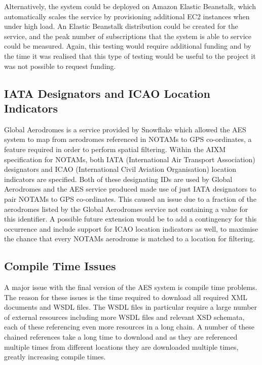 \documentclass[a4paper, 12pt, twoside]{article}
\begin{document}
Alternatively, the system could be deployed on Amazon Elastic Beanstalk, which automatically scales the service by provisioning additional EC2 instances when under high load. An Elastic Beanstalk distribution could be created for the service, and the peak number of subscriptions that the system is able to service could be measured. Again, this testing would require additional funding and by the time it was realised that this type of testing would be useful to the project it was not possible to request funding.

\subsection{IATA Designators and ICAO Location Indicators}
\label{sec:future_designators}

Global Aerodromes is a service provided by Snowflake which allowed the AES system to map from aerodromes referenced in NOTAMs to GPS co-ordinates, a feature required in order to perform spatial filtering. Within the AIXM specification for NOTAMs, both IATA (International Air Transport Association) designators and ICAO (International Civil Aviation Organisation) location indicators are specified. Both of these designating IDs are used by Global Aerodromes and the AES service produced made use of just IATA designators to pair NOTAMs to GPS co-ordinates. This caused an issue due to a fraction of the aerodromes listed by the Global Aerodromes service not containing a value for this identifier. A possible future extension would be to add a contingency for this occurrence and include support for ICAO location indicators as well, to maximise the chance that every NOTAMs aerodrome is matched to a location for filtering.

\subsection{Compile Time Issues}
\label{sec:future_compilation}

A major issue with the final version of the AES system is compile time problems. The reason for these issues is the time required to download all required XML documents and WSDL files. The WSDL files in particular require a large number of external resources including more WSDL files and relevant XSD schemata, each of these referencing even more resources in a long chain. A number of these chained references take a long time to download and as they are referenced multiple times from different locations they are downloaded multiple times, greatly increasing compile times.
\end{document}
